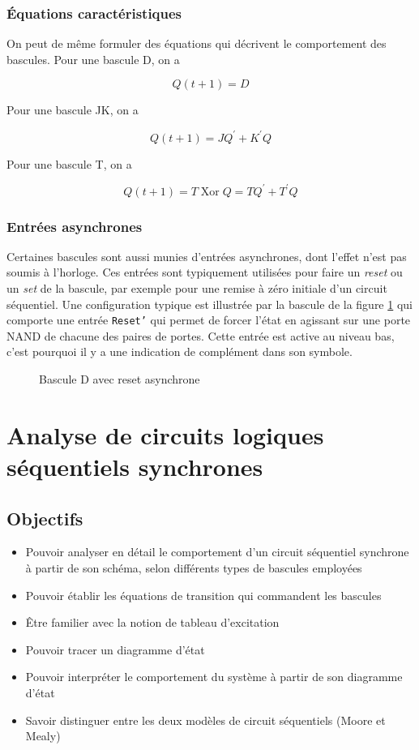 \documentclass[11pt]{article}
\begin{document}
\subsubsection{Équations caractéristiques}
\label{sec:orge4f9759}

On peut de même formuler des équations qui décrivent le comportement
des bascules. Pour une bascule D, on a

$$ Q(t+1) = D $$

Pour une bascule JK, on a

$$ Q(t+1) =J Q^\prime + K^\prime Q $$

Pour une bascule T, on a

$$ Q(t+1) = T \operatorname{Xor} Q = T Q^\prime + T^\prime Q $$

\subsubsection{Entrées asynchrones}
\label{sec:orge7d73f0}

Certaines bascules sont aussi munies d'entrées asynchrones, dont
l'effet n'est pas soumis à l'horloge. Ces entrées sont typiquement
utilisées pour faire un \emph{reset} ou un \emph{set} de la bascule, par exemple
pour une remise à zéro initiale d'un circuit séquentiel. Une
configuration typique est illustrée par la bascule de la figure
\ref{fig:org07cee49} qui comporte une entrée \texttt{Reset'} qui
permet de forcer l'état en agissant sur une porte NAND de chacune des
paires de portes. Cette entrée est active au niveau bas, c'est
pourquoi il y a une indication de complément dans son symbole.

\begin{figure}[htbp]
\centering

\caption{\label{fig:org07cee49}Bascule D avec reset asynchrone}
\end{figure}

\section{Analyse de circuits logiques séquentiels synchrones}
\label{sec:org1dae2f6}
\subsection{Objectifs}
\label{sec:org4e546e4}
\begin{itemize}
\item Pouvoir analyser en détail le comportement d'un circuit séquentiel
synchrone à partir de son schéma, selon différents types de bascules
employées
\item Pouvoir établir les équations de transition qui commandent les bascules
\item Être familier avec la notion de tableau d'excitation
\item Pouvoir tracer un diagramme d'état
\item Pouvoir interpréter le comportement du système à partir de son
diagramme d'état
\item Savoir distinguer entre les deux modèles de circuit séquentiels
(Moore et Mealy)
\end{itemize}
\end{document}
